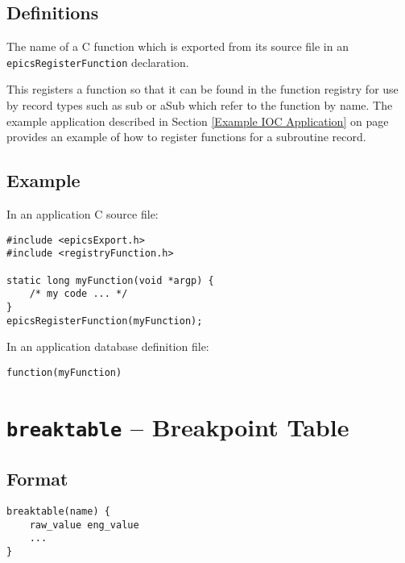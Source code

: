 \subsection{Definitions}

\begin{description}
\item [function\_name] The name of a C function which is exported from its source file in an \verb|epicsRegisterFunction| declaration.
\end{description}

This registers a function so that it can be found in the function registry for use by record types such as sub or aSub which refer to the function by name.
The example application described in Section \ref{Example IOC Application} on page \pageref{Example IOC Application} provides an example of how to register functions for a subroutine record.

\subsection{Example}

In an application C source file:

\begin{verbatim}
#include <epicsExport.h>
#include <registryFunction.h>

static long myFunction(void *argp) {
    /* my code ... */
}
epicsRegisterFunction(myFunction);
\end{verbatim}

In an application database definition file:

\begin{verbatim}
function(myFunction)
\end{verbatim}

\section{\texttt{breaktable} -- Breakpoint Table}

\subsection{Format}

\begin{verbatim}
breaktable(name) {
    raw_value eng_value
    ...
}
\end{verbatim}


